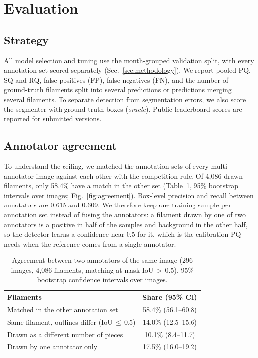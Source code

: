 \documentclass[sigconf]{acmart}
\begin{document}
\section{Evaluation}\label{sec:evaluation}

\subsection{Strategy}
    All model selection and tuning use the month-grouped validation split, with every annotation set scored separately (Sec.~\ref{sec:methodology}). We report pooled PQ, SQ and RQ, false positives (FP), false negatives (FN), and the number of ground-truth filaments split into several predictions or predictions merging several filaments. To separate detection from segmentation errors, we also score the segmenter with ground-truth boxes (\emph{oracle}). Public leaderboard scores are reported for submitted versions.

\subsection{Annotator agreement}
    To understand the ceiling, we matched the annotation sets of every multi-annotator image against each other with the competition rule. Of 4{,}086 drawn filaments, only 58.4\% have a match in the other set (Table~\ref{tab:agreement}, 95\% bootstrap intervals over images; Fig.~\ref{fig:agreement}). Box-level precision and recall between annotators are 0.615 and 0.609. We therefore keep one training sample per annotation set instead of fusing the annotators: a filament drawn by one of two annotators is a positive in half of the samples and background in the other half, so the detector learns a confidence near 0.5 for it, which is the calibration PQ needs when the reference comes from a single annotator.

\begin{table}[t]
    \caption{Agreement between two annotators of the same image (296 images, 4{,}086 filaments, matching at mask IoU\,$>$\,0.5). 95\% bootstrap confidence intervals over images.}
    \label{tab:agreement}
    \small
    \begin{tabularx}{\columnwidth}{Xc}
        \toprule
        Filaments & Share (95\% CI) \\
        \midrule
        Matched in the other annotation set & 58.4\% (56.1--60.8) \\
        Same filament, outlines differ (IoU\,$\le$\,0.5) & 14.0\% (12.5--15.6) \\
        Drawn as a different number of pieces & 10.1\% (8.4--11.7) \\
        Drawn by one annotator only & 17.5\% (16.0--19.2) \\
        \bottomrule
    \end{tabularx}
\end{table}
\end{document}
